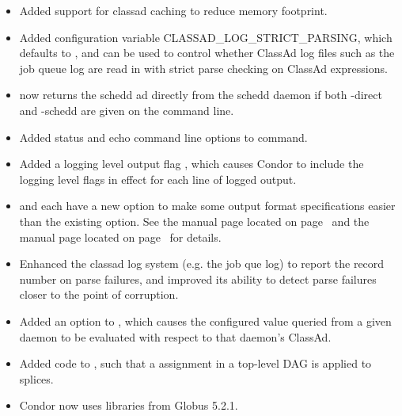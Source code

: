 \begin{itemize}

\item Added support for classad caching to reduce memory footprint. 

\item Added configuration variable CLASSAD\_LOG\_STRICT\_PARSING, which defaults to 
, and can be used to control whether ClassAd log files such as the job queue
log are read in with strict parse checking on ClassAd expressions.

\item {} now returns the schedd ad directly from the schedd daemon
if both -direct and -schedd are given on the command line.

\item Added status and echo command line options to  command.

\item Added a  logging level output flag ,
which causes Condor to include the logging level
flags in effect for each line of logged output.

\item {} and  each have a new  option
to make some output format specifications easier than the existing
 option.
See the  manual page located on page~\pageref{man-condor-status}
and the  manual page located on page~\pageref{man-condor-q} 
for details.

\item Enhanced the classad log system (e.g. the job que log) to report the record number on parse failures, 
and improved its ability to detect parse failures closer to the point of corruption.

\item Added an  option to , which causes the configured value queried from
a given daemon to be evaluated with respect to that daemon's ClassAd.

\item Added code to ,
such that a  assignment in a top-level DAG is applied to splices.

\item Condor now uses libraries from Globus 5.2.1.


\end{itemize}
